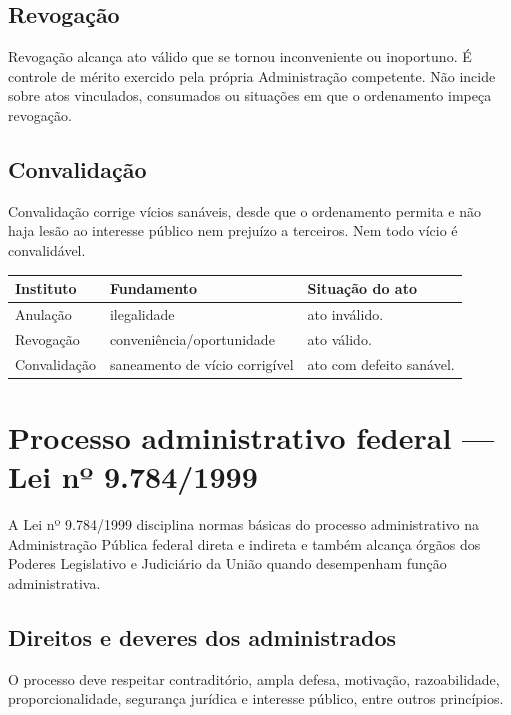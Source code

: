 \subsection{Revogação}

Revogação alcança ato válido que se tornou inconveniente ou inoportuno. É controle de mérito exercido pela própria Administração competente. Não incide sobre atos vinculados, consumados ou situações em que o ordenamento impeça revogação.

\subsection{Convalidação}

Convalidação corrige vícios sanáveis, desde que o ordenamento permita e não haja lesão ao interesse público nem prejuízo a terceiros. Nem todo vício é convalidável.

\begin{table}[ht]
\centering
\small
\begin{tabularx}{\textwidth}{l X X}
\toprule
Instituto & Fundamento & Situação do ato \\
\midrule
Anulação & ilegalidade & ato inválido. \\
Revogação & conveniência/oportunidade & ato válido. \\
Convalidação & saneamento de vício corrigível & ato com defeito sanável. \\
\bottomrule
\end{tabularx}
\end{table}

\section{Processo administrativo federal — Lei nº 9.784/1999}

A Lei nº 9.784/1999 disciplina normas básicas do processo administrativo na Administração Pública federal direta e indireta e também alcança órgãos dos Poderes Legislativo e Judiciário da União quando desempenham função administrativa.

\subsection{Direitos e deveres dos administrados}

O processo deve respeitar contraditório, ampla defesa, motivação, razoabilidade, proporcionalidade, segurança jurídica e interesse público, entre outros princípios.

